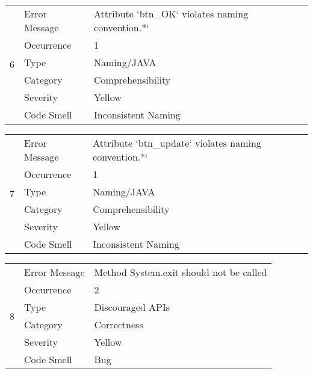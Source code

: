 \documentclass[12pt,english]{article}
\begin{document}
\begin{table}[!ht]
    \begin{tabularx}{\textwidth}{|c|l|X|}
    \hline
        \multirow{6}{*}{6} & Error Message & Attribute `btn\_OK` violates naming convention.*` \\ \cline{2-3}
        & Occurrence & 1 \\ \cline{2-3}
        & Type & Naming/JAVA \\ \cline{2-3}
        & Category & Comprehensibility \\ \cline{2-3}
        & Severity & Yellow \\ \cline{2-3}
        & Code Smell & Inconsistent Naming \\ \hline
    \end{tabularx}
\end{table}

\begin{table}[!ht]
    \begin{tabularx}{\textwidth}{|c|l|X|}
    \hline
        \multirow{6}{*}{7} & Error Message & Attribute `btn\_update` violates naming convention.*` \\ \cline{2-3}
        & Occurrence & 1 \\ \cline{2-3}
        & Type & Naming/JAVA \\ \cline{2-3}
        & Category & Comprehensibility \\ \cline{2-3}
        & Severity & Yellow \\ \cline{2-3}
        & Code Smell & Inconsistent Naming \\ \hline
    \end{tabularx}
\end{table}


\begin{table}[!ht]
    \begin{tabularx}{\textwidth}{|c|l|X|}
    \hline
        \multirow{6}{*}{8} & Error Message & Method System.exit should not be called \\ \cline{2-3}
        & Occurrence & 2 \\ \cline{2-3}
        & Type & Discouraged APIs \\ \cline{2-3}
        & Category & Correctness \\ \cline{2-3}
        & Severity & Yellow \\ \cline{2-3}
        & Code Smell & Bug \\ \hline
    \end{tabularx}
\end{table}
\end{document}
